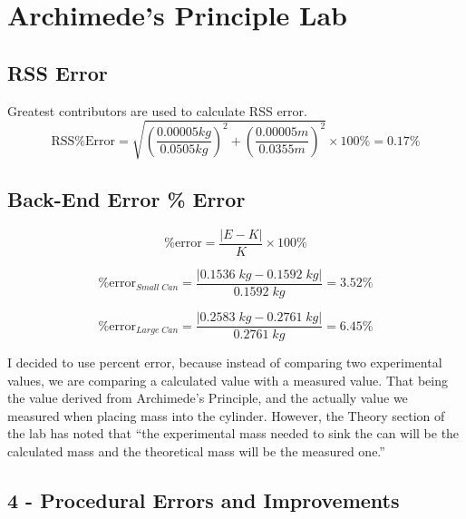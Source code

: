\documentclass{report}
\begin{document}
\chapter*{Archimede's Principle Lab}

\section*{RSS Error}

\begin{center}
  \noindent Greatest contributors are used to calculate RSS error.
  \begin{equation*}
      \text{RSS\% Error} = \sqrt{ \left( \frac{0.00005 kg}{0.0505 kg} \right)^2 
      + \left( \frac{0.00005 m}{0.0355 m} \right)^2}
      \times 100\% = 0.17\%
  \end{equation*}
\end{center}

\section*{Back-End Error \% Error}

  \begin{equation*}
      \% \text{error} = \frac{|E - K|}{K} \times 100 \% 
  \end{equation*}

  \begin{equation*}
      \% \text{error}_{Small \; Can} = \frac{|0.1536 \; kg - 0.1592 \; kg|}{0.1592 \; kg} = 3.52\%
  \end{equation*}

  \begin{equation*}
      \% \text{error}_{Large \; Can} = \frac{|0.2583 \; kg - 0.2761 \; kg|}{0.2761 \; kg} = 6.45\%
  \end{equation*}

  \noindent I decided to use percent error, because instead of comparing two experimental values,
  we are comparing a calculated value with a measured value. That being the value derived from 
  Archimede's Principle, and the actually value we measured when placing mass into the cylinder.
  However, the Theory section of the lab has noted that ``the experimental mass needed to sink the
  can will be the calculated mass and the theoretical mass will be the measured one.''

  \newpage

  \section*{4 - Procedural Errors and Improvements}
\end{document}
